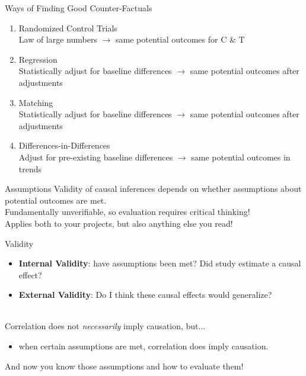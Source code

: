\documentclass[11pt]{beamer}
\begin{document}
\begin{frame}[c]{Ways of Finding Good Counter-Factuals}
\begin{enumerate}
  \pause \item Randomized Control Trials \\
  {\color{gray} Law of large numbers $\rightarrow$ same potential outcomes for C \& T}
  \pause \item Regression \\
  {\color{gray} Statistically adjust for baseline differences $\rightarrow$ same potential outcomes after adjustments}
  \pause \item Matching \\
  {\color{gray} Statistically adjust for baseline differences $\rightarrow$ same potential outcomes after adjustments}
  \pause \item Differences-in-Differences \\
  {\color{gray} Adjust for pre-existing baseline differences $\rightarrow$ same potential outcomes in trends}
\end{enumerate}
\end{frame}

\begin{frame}[c]{Assumptions}
Validity of causal inferences depends on whether assumptions about potential outcomes are met. \\
\pause \alert{Fundamentally unverifiable}, so evaluation requires critical thinking! \\
\vspace*{1cm}
Applies both to your projects, but also anything else you read!
\end{frame}

\begin{frame}[c]{Validity}
\begin{itemize}
  \item \textbf{Internal Validity}: have assumptions been met? Did study estimate a causal effect? 
  \pause \item  \textbf{External Validity}: Do I think these causal effects would generalize?
\end{itemize}
\end{frame}

\begin{frame}[c]{}
   \\
  \vspace*{0.2cm}
  \pause Correlation does not \emph{necessarily} imply causation, \alert{but...}
  \begin{itemize}
    \pause \item when certain assumptions are met, correlation does imply causation. 
  \end{itemize} 
  \pause And now \alert{you} know those assumptions and how to evaluate them!
  \end{frame}
\end{document}
